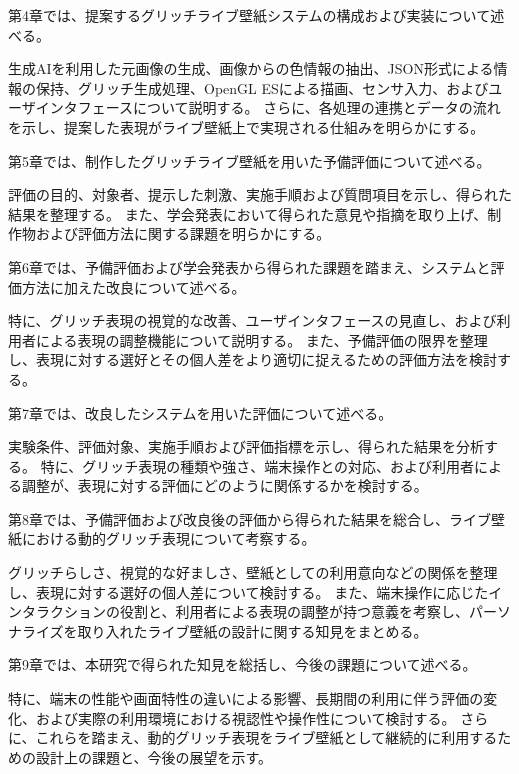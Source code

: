 第4章では、提案するグリッチライブ壁紙システムの構成および実装について述べる。

生成AIを利用した元画像の生成、画像からの色情報の抽出、JSON形式による情報の保持、グリッチ生成処理、OpenGL ESによる描画、センサ入力、およびユーザインタフェースについて説明する。
さらに、各処理の連携とデータの流れを示し、提案した表現がライブ壁紙上で実現される仕組みを明らかにする。


第5章では、制作したグリッチライブ壁紙を用いた予備評価について述べる。

評価の目的、対象者、提示した刺激、実施手順および質問項目を示し、得られた結果を整理する。
また、学会発表において得られた意見や指摘を取り上げ、制作物および評価方法に関する課題を明らかにする。


第6章では、予備評価および学会発表から得られた課題を踏まえ、システムと評価方法に加えた改良について述べる。

特に、グリッチ表現の視覚的な改善、ユーザインタフェースの見直し、および利用者による表現の調整機能について説明する。
また、予備評価の限界を整理し、表現に対する選好とその個人差をより適切に捉えるための評価方法を検討する。


第7章では、改良したシステムを用いた評価について述べる。

実験条件、評価対象、実施手順および評価指標を示し、得られた結果を分析する。
特に、グリッチ表現の種類や強さ、端末操作との対応、および利用者による調整が、表現に対する評価にどのように関係するかを検討する。


第8章では、予備評価および改良後の評価から得られた結果を総合し、ライブ壁紙における動的グリッチ表現について考察する。

グリッチらしさ、視覚的な好ましさ、壁紙としての利用意向などの関係を整理し、表現に対する選好の個人差について検討する。
また、端末操作に応じたインタラクションの役割と、利用者による表現の調整が持つ意義を考察し、パーソナライズを取り入れたライブ壁紙の設計に関する知見をまとめる。


第9章では、本研究で得られた知見を総括し、今後の課題について述べる。

特に、端末の性能や画面特性の違いによる影響、長期間の利用に伴う評価の変化、および実際の利用環境における視認性や操作性について検討する。
さらに、これらを踏まえ、動的グリッチ表現をライブ壁紙として継続的に利用するための設計上の課題と、今後の展望を示す。

